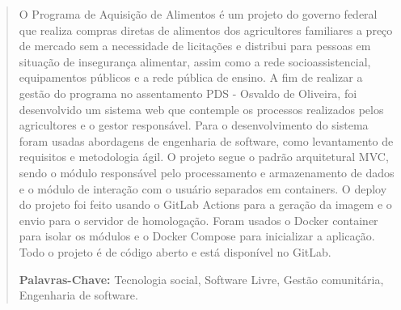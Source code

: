 \begin{abstract}
    
O Programa de Aquisição de Alimentos é um projeto do governo federal que realiza compras diretas de alimentos dos agricultores familiares a preço de mercado sem a necessidade de licitações e distribui para pessoas em situação de insegurança alimentar, assim como a rede socioassistencial, equipamentos públicos e a rede pública de ensino. A fim de realizar a gestão do programa no assentamento PDS - Osvaldo de Oliveira, foi desenvolvido um sistema web que contemple os processos realizados pelos agricultores e o gestor responsável. Para o desenvolvimento do sistema foram usadas abordagens de engenharia de software, como levantamento de requisitos e metodologia ágil. O projeto segue o padrão arquitetural MVC, sendo o módulo responsável pelo processamento e armazenamento de dados e o módulo de interação com o usuário separados em containers. O deploy do projeto foi feito usando o GitLab Actions para a geração da imagem e o envio para o servidor de homologação. Foram usados o Docker container para isolar os módulos e o Docker Compose para inicializar a aplicação. Todo o projeto é de código aberto e está disponível no GitLab.

\vspace{\baselineskip}
\noindent\textbf{Palavras-Chave:} Tecnologia social, Software Livre, Gestão comunitária, Engenharia de software.

\end{abstract}
